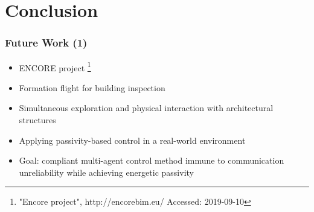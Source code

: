 \section{Conclusion}

\begin{frame}
	\frametitle{Future Work (1)}
	\begin{itemize}
		\item ENCORE project \footnote{"Encore project", http://encorebim.eu/ Accessed: 2019-09-10}
		\item Formation flight for building inspection
		\item Simultaneous exploration and physical interaction with architectural structures
		\item Applying passivity-based control in a real-world environment
		\item Goal: compliant multi-agent control method immune to communication unreliability while achieving energetic passivity
	\end{itemize}
\end{frame}

